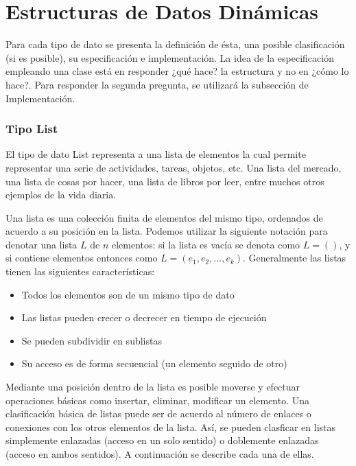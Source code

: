 \part{Estructuras de Datos Dinámicas}
\setcounter{section}{0}

Para cada tipo de dato se presenta la definición de ésta, una posible clasificación (si es posible), su especificación e implementación. La idea de la especificación empleando una clase está en responder ¿qué hace? la estructura y no en ¿cómo lo hace?. Para responder la segunda pregunta, se utilizará la subsección de Implementación.

\section{Tipo List}

El tipo de dato List representa a una lista de elementos la cual permite representar una serie de actividades, tareas, objetos, etc. Una lista del mercado, una lista de cosas por hacer, una lista de libros por leer, entre muchos otros ejemplos de la vida diaria.

Una lista es una colección finita de elementos del mismo tipo, ordenados de acuerdo a su posición en la lista. Podemos utilizar la siguiente notación para denotar una lista $L$ de $n$ elementos: si la lista es vacía se denota como $L=()$, y si contiene elementos entonces como $L=(e_1, e_2, ..., e_k)$. Generalmente las listas tienen las siguientes características:
\begin{itemize}
\item Todos los elementos son de un mismo tipo de dato
\item Las listas pueden crecer o decrecer en tiempo de ejecución
\item Se pueden subdividir en sublistas
\item Su acceso es de forma secuencial (un elemento seguido de otro)
\end{itemize}

Mediante una posición dentro de la lista es posible moverse y efectuar operaciones básicas como insertar, eliminar, modificar un elemento. Una clasificación básica de listas puede ser de acuerdo al número de enlaces o conexiones con los otros elementos de la lista. Así, se pueden clasficar en listas simplemente enlazadas (acceso en un solo sentido) o doblemente enlazadas (acceso en ambos sentidos). A continuación se describe cada una de ellas.

